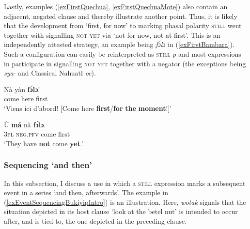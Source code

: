 Lastly, examples (\ref{exFirstQuechua}, \ref{exFirstQuechuaMote}) also contain an adjacent, negated clause and thereby illustrate another point. Thus, it is likely that the development from \lq first, for now\rq{ }to marking phasal polarity \textsc{still} went together with signalling \textsc{not yet} via \lq not for now, not at first\rq{}. This is an independently attested strategy, an example being  \textit{fɔ́lɔ} in (\ref{exFirstBambara}). Such a configuration can easily be reinterpreted as \textsc{still} \mbox{\neg{}\textit{p}} and most expressions in  participate in signalling \textsc{not yet} together with a negator (the exceptions being  \mbox{\textit{sya}-} and Classical Nahuatl \textit{oc}).
\begin{exe}
	\ex \label{exFirstBambara}
	\begin{xlist}		
		\exi{}
		\ex\label{exFirstBambara2}
		\gll Nà yàn \textbf{fɔ́lɔ}!\\
		come here first\\
		\glt \lq Viens ici d’abord! [Come here \textbf{first}/\textbf{for} \textbf{the} \textbf{moment}!]\rq{ }
		 
		\ex\label{exFirstBambara3}
		\gll Ù \textbf{má} nà \textbf{fɔ́lɔ}.\\
		3\textsc{pl} \textsc{neg}.\textsc{pfv} come first\\
		\glt \lq They have \textbf{not} come \textbf{yet}.\rq{ }\parencite[105]{DombrowskyHahn2020}
	\end{xlist}
\end{exe}

\subsubsection{Sequencing \lq and then\rq{}}\label{sectionEventSequencing}
In this subsection, I discuss a use in which a \textsc{still} expression marks a subsequent event in a series \lq and then, afterwards\rq{}. The  example in (\ref{exEventSequencingBukiyipIntro}) is an illustration. Here, \textit{wotak} signals that the situation depicted in its host clause \lq look at the betel nut\rq{ }is intended to occur after, and is tied to, the one depicted in the preceding clause.


